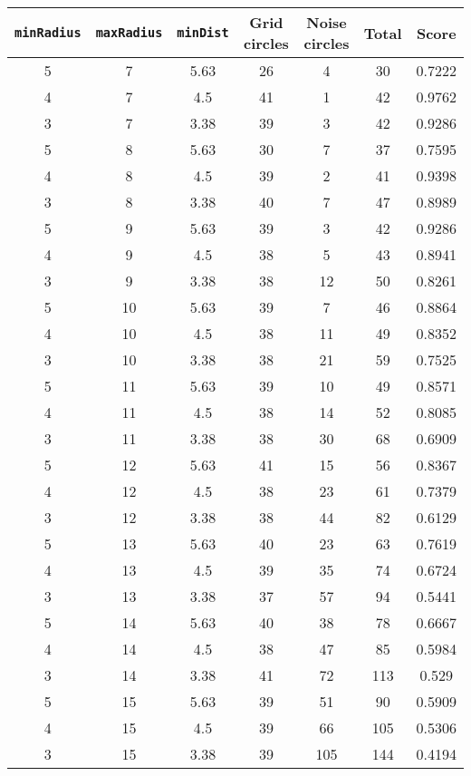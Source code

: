 \documentclass[letterpaper, 12pt]{article}
\begin{document}
\begin{longtable}{|c|c|c|c|c|c|c|}
\hline
\textbf{\texttt{minRadius}} & \textbf{\texttt{maxRadius}} & \textbf{\texttt{minDist}} & \textbf{Grid circles} & \textbf{Noise circles} & \textbf{Total} & \textbf{Score} \\
\hline
5 & 7 & 5.63 & 26 & 4 & 30 & 0.7222 \\
\hline
4 & 7 & 4.5 & 41 & 1 & 42 & 0.9762 \\
\hline
3 & 7 & 3.38 & 39 & 3 & 42 & 0.9286 \\
\hline
5 & 8 & 5.63 & 30 & 7 & 37 & 0.7595 \\
\hline
4 & 8 & 4.5 & 39 & 2 & 41 & 0.9398 \\
\hline
3 & 8 & 3.38 & 40 & 7 & 47 & 0.8989 \\
\hline
5 & 9 & 5.63 & 39 & 3 & 42 & 0.9286 \\
\hline
4 & 9 & 4.5 & 38 & 5 & 43 & 0.8941 \\
\hline
3 & 9 & 3.38 & 38 & 12 & 50 & 0.8261 \\
\hline
5 & 10 & 5.63 & 39 & 7 & 46 & 0.8864 \\
\hline
4 & 10 & 4.5 & 38 & 11 & 49 & 0.8352 \\
\hline
3 & 10 & 3.38 & 38 & 21 & 59 & 0.7525 \\
\hline
5 & 11 & 5.63 & 39 & 10 & 49 & 0.8571 \\
\hline
4 & 11 & 4.5 & 38 & 14 & 52 & 0.8085 \\
\hline
3 & 11 & 3.38 & 38 & 30 & 68 & 0.6909 \\
\hline
5 & 12 & 5.63 & 41 & 15 & 56 & 0.8367 \\
\hline
4 & 12 & 4.5 & 38 & 23 & 61 & 0.7379 \\
\hline
3 & 12 & 3.38 & 38 & 44 & 82 & 0.6129 \\
\hline
5 & 13 & 5.63 & 40 & 23 & 63 & 0.7619 \\
\hline
4 & 13 & 4.5 & 39 & 35 & 74 & 0.6724 \\
\hline
3 & 13 & 3.38 & 37 & 57 & 94 & 0.5441 \\
\hline
5 & 14 & 5.63 & 40 & 38 & 78 & 0.6667 \\
\hline
4 & 14 & 4.5 & 38 & 47 & 85 & 0.5984 \\
\hline
3 & 14 & 3.38 & 41 & 72 & 113 & 0.529 \\
\hline
5 & 15 & 5.63 & 39 & 51 & 90 & 0.5909 \\
\hline
4 & 15 & 4.5 & 39 & 66 & 105 & 0.5306 \\
\hline
3 & 15 & 3.38 & 39 & 105 & 144 & 0.4194 \\

\end{longtable}
\end{document}
